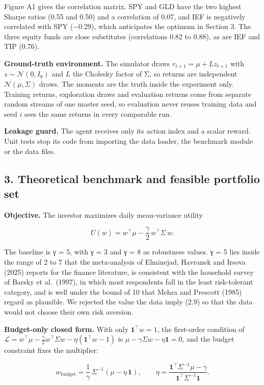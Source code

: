 \documentclass[
  11pt]{article}
\begin{document}
Figure A1 gives the correlation matrix. SPY and GLD have the two highest
Sharpe ratios (0.55 and 0.50) and a correlation of 0.07, and IEF is
negatively correlated with SPY (−0.29), which anticipates the optimum in
Section 3. The three equity funds are close substitutes (correlations
0.82 to 0.88), as are IEF and TIP (0.76).

\textbf{Ground-truth environment.} The simulator draws
\(r_{t+1} = \mu + L z_{t+1}\) with \(z \sim \mathcal{N}(0, I_9)\) and
\(L\) the Cholesky factor of Σ, so returns are independent
\(\mathcal{N}(\mu, \Sigma)\) draws. The moments are the truth inside the
experiment only. Training returns, exploration draws and evaluation
returns come from separate random streams of one master seed, so
evaluation never reuses training data and seed \(i\) sees the same
returns in every comparable run.

\textbf{Leakage guard.} The agent receives only its action index and a
scalar reward. Unit tests stop its code from importing the data loader,
the benchmark module or the data files.

\subsection{3. Theoretical benchmark and feasible portfolio
set}\label{theoretical-benchmark-and-feasible-portfolio-set}

\textbf{Objective.} The investor maximizes daily mean-variance utility

\[U(w) = w^\top \mu - \frac{\gamma}{2}\, w^\top \Sigma\, w .\]

The baseline is γ = 5, with γ = 3 and γ = 8 as robustness values. γ = 5
lies inside the range of 2 to 7 that the meta-analysis of Elminejad,
Havranek and Irsova (2025) reports for the finance literature, is
consistent with the household survey of Barsky et al.~(1997), in which
most respondents fall in the least risk-tolerant category, and is well
under the bound of 10 that Mehra and Prescott (1985) regard as
plausible. We rejected the value the data imply (2.9) so that the data
would not choose their own risk aversion.

\textbf{Budget-only closed form.} With only \(\mathbf{1}^\top w = 1\),
the first-order condition of
\(\mathcal{L} = w^\top\mu - \tfrac{\gamma}{2} w^\top \Sigma w - \eta(\mathbf{1}^\top w - 1)\)
is \(\mu - \gamma \Sigma w - \eta \mathbf{1} = 0\), and the budget
constraint fixes the multiplier:

\[w_{\text{budget}} = \frac{1}{\gamma}\,\Sigma^{-1}\left(\mu - \eta\,\mathbf{1}\right), \qquad \eta = \frac{\mathbf{1}^\top \Sigma^{-1}\mu - \gamma}{\mathbf{1}^\top \Sigma^{-1}\mathbf{1}} .\]
\end{document}
